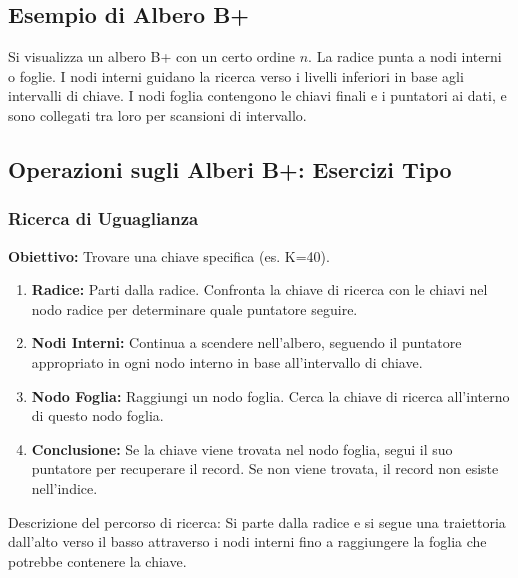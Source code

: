 \subsection{Esempio di Albero B+}
Si visualizza un albero B+ con un certo ordine $n$. La radice punta a nodi interni o foglie. I nodi interni guidano la ricerca verso i livelli inferiori in base agli intervalli di chiave. I nodi foglia contengono le chiavi finali e i puntatori ai dati, e sono collegati tra loro per scansioni di intervallo.

\subsection{Operazioni sugli Alberi B+: Esercizi Tipo}

\subsubsection{Ricerca di Uguaglianza}
\textbf{Obiettivo:} Trovare una chiave specifica (es. K=40).
\begin{enumerate}
    \item \textbf{Radice:} Parti dalla radice. Confronta la chiave di ricerca con le chiavi nel nodo radice per determinare quale puntatore seguire.
    \item \textbf{Nodi Interni:} Continua a scendere nell'albero, seguendo il puntatore appropriato in ogni nodo interno in base all'intervallo di chiave.
    \item \textbf{Nodo Foglia:} Raggiungi un nodo foglia. Cerca la chiave di ricerca all'interno di questo nodo foglia.
    \item \textbf{Conclusione:} Se la chiave viene trovata nel nodo foglia, segui il suo puntatore per recuperare il record. Se non viene trovata, il record non esiste nell'indice.
\end{enumerate}
Descrizione del percorso di ricerca: Si parte dalla radice e si segue una traiettoria dall'alto verso il basso attraverso i nodi interni fino a raggiungere la foglia che potrebbe contenere la chiave.

